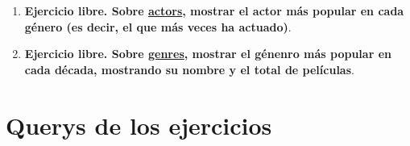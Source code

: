 \documentclass[a4paper,onecolumn]{article}
\let\stdsection\section
\renewcommand\section{\newpage\stdsection}
\begin{document}
\begin{sloppypar}
\begin{enumerate}
\begin{center}
\begin{figure}[h!]
        \end{figure}
    \end{center}
    \item \textbf{Ejercicio libre. Sobre \underline{actors}, mostrar el actor más popular en cada género (es decir, el que más veces ha actuado)}. 
    \begin{center}
        \begin{figure}[h!]
        \end{figure}
    \end{center}
    \item \textbf{Ejercicio libre. Sobre \underline{genres}, mostrar el génenro más popular en cada década, mostrando su nombre y el total de películas}. 
    \begin{center}
        \begin{figure}[h!]
        \end{figure}
    \end{center}
\end{enumerate}

\end{sloppypar}

\section{Querys de los ejercicios}

\end{document}
